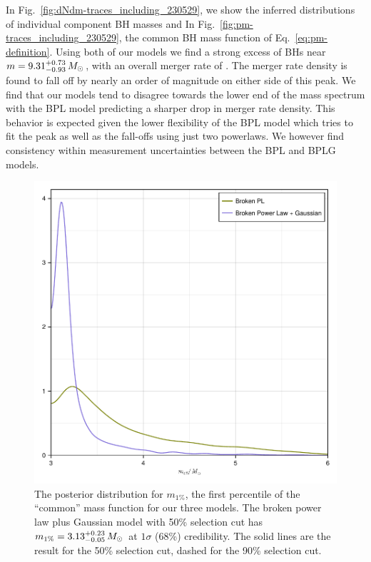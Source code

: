 \documentclass[modern]{aastex631}
\begin{document}
In Fig.~\ref{fig:dNdm-traces_including_230529}, we show the inferred distributions of individual component BH masses and In Fig.~\ref{fig:pm-traces_including_230529}, the common BH mass function of Eq.~\eqref{eq:pm-definition}. Using both of our models we find a strong excess of BHs near $m=9.31^{+0.73}_{-0.93} \, M_\odot$, with an overall merger rate of \dNlogmpeakincludingnewunits. The merger rate density is found to fall off by nearly an order of magnitude on either side of this peak. We find that our models tend to disagree towards the lower end of the mass spectrum with the BPL model predicting a sharper drop in merger rate density. This behavior is expected given the lower flexibility of the BPL model which tries to fit the peak as well as the fall-offs using just two powerlaws. We however find consistency within measurement uncertainties between the BPL and BPLG models.

\begin{figure}
    \includegraphics[width=\columnwidth]{figures/m1pct_including_230529.pdf}
    \caption{\label{fig:m1pct_including_230529} The posterior distribution for $m_{1\%}$, the
    first percentile of the ``common'' mass function for our three models.  The
    broken power law plus Gaussian model with 50\% selection cut has $m_{1\%} =
    3.13^{+0.23}_{-0.05} \, M_\odot$ at $1\sigma$ (68\%) credibility.  The solid lines are
    the result for the 50\% selection cut, dashed for the 90\% selection cut.}
\end{figure}
\end{document}
